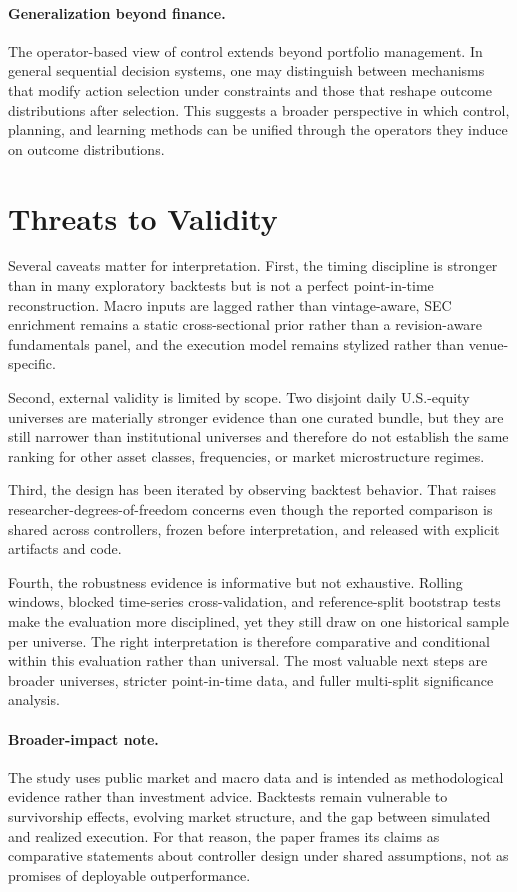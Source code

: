 \documentclass[10pt,twocolumn]{article}
\begin{document}
\paragraph{Generalization beyond finance.}
The operator-based view of control extends beyond portfolio management. In
general sequential decision systems, one may distinguish between mechanisms
that modify action selection under constraints and those that reshape outcome
distributions after selection. This suggests a broader perspective in which
control, planning, and learning methods can be unified through the operators
they induce on outcome distributions.

\section{Threats to Validity}

Several caveats matter for interpretation. First, the timing discipline is
stronger than in many exploratory backtests but is not a perfect point-in-time
reconstruction. Macro inputs are lagged rather than vintage-aware, SEC
enrichment remains a static cross-sectional prior rather than a revision-aware
fundamentals panel, and the execution model remains stylized rather than
venue-specific.

Second, external validity is limited by scope. Two disjoint daily U.S.-equity
universes are materially stronger evidence than one curated bundle, but they
are still narrower than institutional universes and therefore do not establish
the same ranking for other asset classes, frequencies, or market microstructure
regimes.

Third, the design has been iterated by observing backtest behavior. That raises
researcher-degrees-of-freedom concerns even though the reported comparison is
shared across controllers, frozen before interpretation, and released with
explicit artifacts and code.

Fourth, the robustness evidence is informative but not exhaustive. Rolling
windows, blocked time-series cross-validation, and reference-split bootstrap
tests make the evaluation more disciplined, yet they still draw on one
historical sample per universe. The right interpretation is therefore
comparative and conditional within this evaluation rather than universal. The
most valuable next steps are broader universes, stricter point-in-time data,
and fuller multi-split significance analysis.

\paragraph{Broader-impact note.}
The study uses public market and macro data and is intended as methodological
evidence rather than investment advice. Backtests remain vulnerable to
survivorship effects, evolving market structure, and the gap between simulated
and realized execution. For that reason, the paper frames its claims as
comparative statements about controller design under shared assumptions, not as
promises of deployable outperformance.
\end{document}
